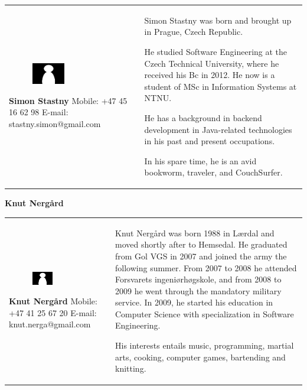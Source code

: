 \documentclass[11pt]{book}
\begin{document}
\begin{table}[H]
\centering
\begin{tabular}{ p{7cm} p{7cm} }
\parbox{7cm}{
\begin{figure}[H]
      \includegraphics[width=0.4\textwidth]{Figures/Person.png}
      \label{fig:partners_group_simon}
\end{figure}
\textbf{Simon Stastny}\\
Mobile: +47 45 16 62 98\\
E-mail: stastny.simon@gmail.com} & \parbox{7cm}{
    
Simon Stastny was born and brought up in Prague, Czech Republic.

He studied Software Engineering at the Czech Technical University, where he received his Bc in 2012. He now is a student of MSc in Information Systems at NTNU.

He has a background in backend development in Java-related technologies in his past and present occupations.

In his spare time, he is an avid bookworm, traveler, and CouchSurfer.

}
\end{tabular}
\label{tab:partners_group_simon}
\end{table}

\textbf{Knut Nergård}
\begin{table}[H]
\centering
\begin{tabular}{ p{7cm} p{7cm} }
\parbox{7cm}{
\begin{figure}[H]
      \includegraphics[width=0.4\textwidth]{Figures/Person.png}
      \label{fig:partners_group_knut}
\end{figure}
\textbf{Knut Nergård}\\
Mobile: +47 41 25 67 20\\
E-mail: knut.nerga@gmail.com} & \parbox{7cm}{
Knut Nergård was born 1988 in Lærdal and moved shortly after to Hemsedal. He graduated from Gol VGS in 2007 and joined the army the following summer. From 2007 to 2008 he attended Forsvarets ingeniørhøgskole, and from 2008 to 2009 he went through the mandatory military service. In 2009, he started his education in Computer Science with specialization in Software Engineering. 

His interests entails music, programming, martial arts, cooking, computer games, bartending and knitting.
}
\end{tabular}
\label{tab:partners_group_knut}
\end{table}
\end{document}

